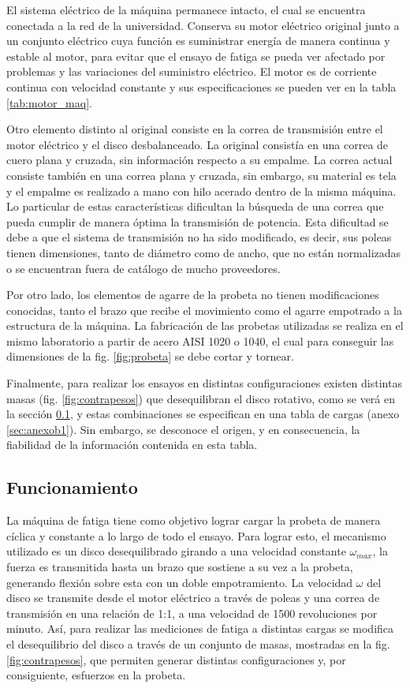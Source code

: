 El sistema eléctrico de la máquina permanece intacto, el cual se encuentra conectada a la red de la universidad. Conserva su motor eléctrico original junto a un conjunto eléctrico cuya función es suministrar energía de manera continua y estable al motor, para evitar que el ensayo de fatiga se pueda ver afectado por problemas y las variaciones del suministro eléctrico. El motor es de corriente continua con velocidad constante y sus especificaciones se pueden ver en la tabla \ref{tab:motor_maq}.

Otro elemento distinto al original consiste en la correa de transmisión entre el motor eléctrico y el disco desbalanceado. La original consistía en una correa de cuero plana y cruzada, sin información respecto a su empalme. La correa actual consiste también en una correa plana y cruzada, sin embargo, su material es tela y el empalme es realizado a mano con hilo acerado dentro de la misma máquina. Lo particular de estas características dificultan la búsqueda de una correa que pueda cumplir de manera óptima la transmisión de potencia. Esta dificultad se debe a que el sistema de transmisión no ha sido modificado, es decir, sus poleas tienen dimensiones, tanto de diámetro como de ancho, que no están normalizadas o se encuentran fuera de catálogo de mucho proveedores. 

Por otro lado, los elementos de agarre de la probeta no tienen modificaciones conocidas, tanto el brazo que recibe el movimiento como el agarre empotrado a la estructura de la máquina. La fabricación de las probetas utilizadas se realiza en el mismo laboratorio a partir de acero AISI 1020 o 1040, el cual para conseguir las dimensiones de la fig. \ref{fig:probeta} se debe cortar y tornear.

Finalmente, para realizar los ensayos en distintas configuraciones existen distintas masas (fig. \ref{fig:contrapesos}) que desequilibran el disco rotativo, como se verá en la sección \ref{sec:funcionamiento}, y estas combinaciones se especifican en una tabla de cargas (anexo \ref{sec:anexob1}). Sin embargo, se desconoce el origen, y en consecuencia, la fiabilidad de la información contenida en esta tabla.

\subsection{Funcionamiento}
\label{sec:funcionamiento}
La máquina de fatiga tiene como objetivo lograr cargar la probeta de manera cíclica y constante a lo largo de todo el ensayo. Para lograr esto, el mecanismo utilizado es un disco desequilibrado girando a una velocidad constante $\omega_{max}$, la fuerza es transmitida hasta un brazo que sostiene a su vez a la probeta, generando flexión sobre esta con un doble empotramiento. La velocidad $\omega$ del disco se transmite desde el motor eléctrico a través de poleas y una correa de transmisión en una relación de 1:1, a una velocidad de 1500 revoluciones por minuto. Así, para realizar las mediciones de fatiga a distintas cargas se modifica el desequilibrio del disco a través de un conjunto de masas, mostradas en la fig. \ref{fig:contrapesos}, que permiten generar distintas configuraciones y, por consiguiente, esfuerzos en la probeta.

